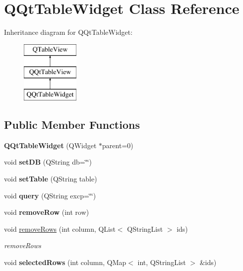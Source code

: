 \hypertarget{class_q_qt_table_widget}{}\section{Q\+Qt\+Table\+Widget Class Reference}
\label{class_q_qt_table_widget}
Inheritance diagram for Q\+Qt\+Table\+Widget\+:\begin{figure}[H]
\begin{center}
\leavevmode
\includegraphics[height=3.000000cm]{class_q_qt_table_widget}
\end{center}
\end{figure}
\subsection*{Public Member Functions}
\begin{DoxyCompactItemize}
\item 
\mbox{\label{class_q_qt_table_widget_aa698d0a1e4b3639092ff7ba9d28f1b42}} 
{\bfseries Q\+Qt\+Table\+Widget} (Q\+Widget $\ast$parent=0)
\item 
\mbox{\label{class_q_qt_table_widget_a442807ee56e4d14d76f1fbd7c00da3b0}} 
void {\bfseries set\+DB} (Q\+String db=\char`\"{}\char`\"{})
\item 
\mbox{\label{class_q_qt_table_widget_a2b6994cea59561bb1d2e71c2b398e14e}} 
void {\bfseries set\+Table} (Q\+String table)
\item 
\mbox{\label{class_q_qt_table_widget_a3c1ba6bef96c57066f1262d03b31ebeb}} 
void {\bfseries query} (Q\+String excp=\char`\"{}\char`\"{})
\item 
\mbox{\label{class_q_qt_table_widget_aee723a42b7ef02f95b03811955061562}} 
void {\bfseries remove\+Row} (int row)
\item 
void \mbox{\hyperlink{class_q_qt_table_widget_a919120d6fc5631f2121e79c902d2d531}{remove\+Rows}} (int column, Q\+List$<$ Q\+String\+List $>$ ids)
\begin{DoxyCompactList}\small\item\em remove\+Rows \end{DoxyCompactList}\item 
\mbox{\label{class_q_qt_table_widget_a3b25e70bba4032a5896e2a564979389d}} 
void {\bfseries selected\+Rows} (int column, Q\+Map$<$ int, Q\+String\+List $>$ \&ids)
\end{DoxyCompactItemize}


